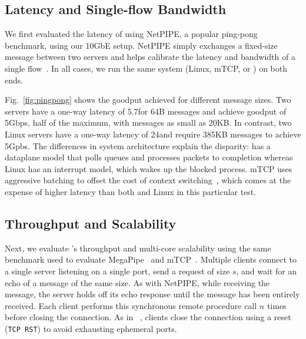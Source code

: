 \subsection{Latency and Single-flow Bandwidth}
\label{sec:eval:netpipe}

We first evaluated the latency of \ix using NetPIPE, a popular
ping-pong benchmark, using our 10GbE setup.  NetPIPE simply exchanges
a fixed-size message between two servers and helps calibrate the
latency and bandwidth of a single flow~\cite{snell1996netpipe}.  In
all cases, we run the same system (Linux, mTCP, or \ix) on both ends.

Fig.~\ref{fig:pingpong} shows the goodput achieved for different
message sizes.  Two \ix servers have a one-way latency of
5.7\microsecond for 64B messages and achieve goodput of 5Gbps, half of
the maximum, with messages as small as 20KB. In contrast, two Linux
servers have a one-way latency of 24\microsecond and require 385KB
messages to achieve 5Gpbs.  The differences in system architecture
explain the disparity: \ix has a dataplane model that polls queues and
processes packets to completion whereas Linux has an interrupt model,
which wakes up the blocked process.  mTCP uses aggressive batching to
offset the cost of context switching~\cite{jeong2014mtcp}, which comes
  at the expense of higher latency than both \ix and Linux in this
  particular test.

 


  \subsection{Throughput and Scalability}
\label{sec:eval:short}

Next, we evaluate \ix's throughput and multi-core scalability using
the same benchmark used to evaluate
MegaPipe~\cite{DBLP:conf/osdi/HanMCR12} and
mTCP~\cite{jeong2014mtcp}. Multiple clients connect to a single server
listening on a single port, send a request of size $s$, and wait for
an echo of a message of the same size.  As with NetPIPE, while
receiving the message, the server holds off its echo response until
the message has been entirely received.  Each client performs this
synchronous remote procedure call $n$ times before closing the
connection.  As in ~\cite{jeong2014mtcp}, clients close the connection
using a reset (\texttt{TCP RST}) to avoid exhausting ephemeral ports.


